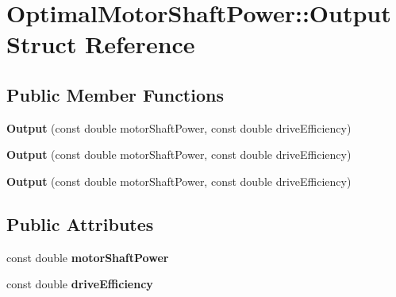 \hypertarget{struct_optimal_motor_shaft_power_1_1_output}{}\section{Optimal\+Motor\+Shaft\+Power\+:\+:Output Struct Reference}
\label{struct_optimal_motor_shaft_power_1_1_output}
\subsection*{Public Member Functions}
\begin{DoxyCompactItemize}
\item 
\mbox{\label{struct_optimal_motor_shaft_power_1_1_output_a8e1cae3343d3d6753e08720957b6100a}} 
{\bfseries Output} (const double motor\+Shaft\+Power, const double drive\+Efficiency)
\item 
\mbox{\label{struct_optimal_motor_shaft_power_1_1_output_a8e1cae3343d3d6753e08720957b6100a}} 
{\bfseries Output} (const double motor\+Shaft\+Power, const double drive\+Efficiency)
\item 
\mbox{\label{struct_optimal_motor_shaft_power_1_1_output_a8e1cae3343d3d6753e08720957b6100a}} 
{\bfseries Output} (const double motor\+Shaft\+Power, const double drive\+Efficiency)
\end{DoxyCompactItemize}
\subsection*{Public Attributes}
\begin{DoxyCompactItemize}
\item 
\mbox{\label{struct_optimal_motor_shaft_power_1_1_output_ae2a70b8119760c1542d3c14bfb07458d}} 
const double {\bfseries motor\+Shaft\+Power}
\item 
\mbox{\label{struct_optimal_motor_shaft_power_1_1_output_a9764d33f91711db8286f7ef26ebe9245}} 
const double {\bfseries drive\+Efficiency}
\end{DoxyCompactItemize}


